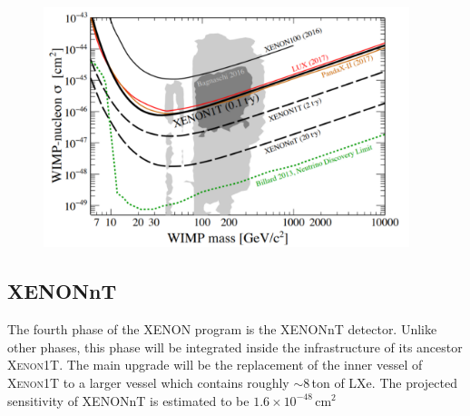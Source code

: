 \begin{figure}[]
	\centering
	\includegraphics[width=0.95\textwidth]{figs/xe1tLimit.png}
	\label{fig:xe1tLim}
\end{figure}


\subsection{XENONnT}
\label{sec:xenT}

The fourth phase of the XENON program is the XENONnT detector. Unlike other phases, this phase will be integrated inside the infrastructure of its ancestor \textsc{Xenon1T}. The main upgrade will be the replacement of the inner vessel of \textsc{Xenon1T} to a larger vessel which contains roughly $\sim8$\,ton of LXe. The projected sensitivity of XENONnT is estimated to be $1.6\times10^{-48}$\,cm$^{2}$ 
